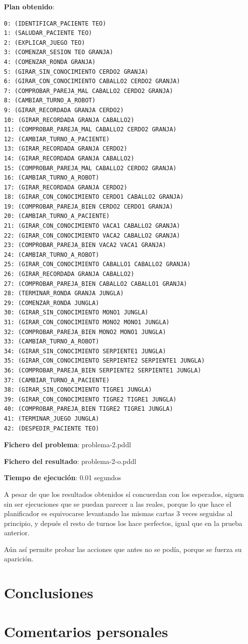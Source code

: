 \documentclass{uc3mpracticas}
\begin{document}
  \begin{multicols}{2}
    \textbf{Plan obtenido}:

    \begin{lstlisting}
0: (IDENTIFICAR_PACIENTE TEO)
1: (SALUDAR_PACIENTE TEO)
2: (EXPLICAR_JUEGO TEO)
3: (COMENZAR_SESION TEO GRANJA)
4: (COMENZAR_RONDA GRANJA)
5: (GIRAR_SIN_CONOCIMIENTO CERDO2 GRANJA)
6: (GIRAR_CON_CONOCIMIENTO CABALLO2 CERDO2 GRANJA)
7: (COMPROBAR_PAREJA_MAL CABALLO2 CERDO2 GRANJA)
8: (CAMBIAR_TURNO_A_ROBOT)
9: (GIRAR_RECORDADA GRANJA CERDO2)
10: (GIRAR_RECORDADA GRANJA CABALLO2)
11: (COMPROBAR_PAREJA_MAL CABALLO2 CERDO2 GRANJA)
12: (CAMBIAR_TURNO_A_PACIENTE)
13: (GIRAR_RECORDADA GRANJA CERDO2)
14: (GIRAR_RECORDADA GRANJA CABALLO2)
15: (COMPROBAR_PAREJA_MAL CABALLO2 CERDO2 GRANJA)
16: (CAMBIAR_TURNO_A_ROBOT)
17: (GIRAR_RECORDADA GRANJA CERDO2)
18: (GIRAR_CON_CONOCIMIENTO CERDO1 CABALLO2 GRANJA)
19: (COMPROBAR_PAREJA_BIEN CERDO2 CERDO1 GRANJA)
20: (CAMBIAR_TURNO_A_PACIENTE)
21: (GIRAR_CON_CONOCIMIENTO VACA1 CABALLO2 GRANJA)
22: (GIRAR_CON_CONOCIMIENTO VACA2 CABALLO2 GRANJA)
23: (COMPROBAR_PAREJA_BIEN VACA2 VACA1 GRANJA)
24: (CAMBIAR_TURNO_A_ROBOT)
25: (GIRAR_CON_CONOCIMIENTO CABALLO1 CABALLO2 GRANJA)
26: (GIRAR_RECORDADA GRANJA CABALLO2)
27: (COMPROBAR_PAREJA_BIEN CABALLO2 CABALLO1 GRANJA)
28: (TERMINAR_RONDA GRANJA JUNGLA)
29: (COMENZAR_RONDA JUNGLA)
30: (GIRAR_SIN_CONOCIMIENTO MONO1 JUNGLA)
31: (GIRAR_CON_CONOCIMIENTO MONO2 MONO1 JUNGLA)
32: (COMPROBAR_PAREJA_BIEN MONO2 MONO1 JUNGLA)
33: (CAMBIAR_TURNO_A_ROBOT)
34: (GIRAR_SIN_CONOCIMIENTO SERPIENTE1 JUNGLA)
35: (GIRAR_CON_CONOCIMIENTO SERPIENTE2 SERPIENTE1 JUNGLA)
36: (COMPROBAR_PAREJA_BIEN SERPIENTE2 SERPIENTE1 JUNGLA)
37: (CAMBIAR_TURNO_A_PACIENTE)
38: (GIRAR_SIN_CONOCIMIENTO TIGRE1 JUNGLA)
39: (GIRAR_CON_CONOCIMIENTO TIGRE2 TIGRE1 JUNGLA)
40: (COMPROBAR_PAREJA_BIEN TIGRE2 TIGRE1 JUNGLA)
41: (TERMINAR_JUEGO JUNGLA)
42: (DESPEDIR_PACIENTE TEO)
    \end{lstlisting}

    \columnbreak

    \textbf{Fichero del problema}: problema-2.pddl

    \textbf{Fichero del resultado}: problema-2-o.pddl

    \textbf{Tiempo de ejecución}: 0.01 segundos
  \end{multicols}

  A pesar de que los resultados obtenidos sí concuerdan con los esperados, siguen sin ser ejecuciones que se puedan parecer a las reales, porque lo que hace el planificador es equivocarse levantando las mismas cartas 3 veces seguidas al principio, y depués el resto de turnos los hace perfectos, igual que en la prueba anterior.

  \vspace{2mm}

  Aún así permite probar las acciones que antes no se podía, porque se fuerza su aparición.


  \section{Conclusiones}


  \section{Comentarios personales}
\end{document}
